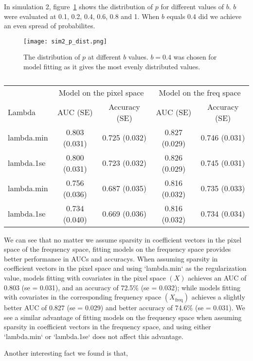 \documentclass[12pt]{article}
\begin{document}
In simulation 2, figure~\ref{fig:sim2_p_dist} shows the distribution of \( p \)
for different values of \( b \). \( b \) were evaluated at 0.1, 0.2, 0.4, 0.6,
0.8 and 1. When \( b \) equals 0.4 did we achieve an even spread of
probabilites.

\begin{figure}[H] 
	\centering
	\texttt{[image: sim2\_p\_dist.png]} 
	\caption{The distribution of \(p\) at different \( b \) values. \( b = 0.4 \) was
chosen for model fitting as it gives the most evenly distributed values.}
	\label{fig:sim2_p_dist} 
\end{figure}


\begin{table}[h!]
\centering
\caption{}
\label{tab:auc_acc_table}
\begin{tabular}{l|cc|cc}
\toprule
& \multicolumn{2}{c}{Model on the pixel space} & \multicolumn{2}{c}{Model on the freq space} \\ 
	Lambda & AUC (SE) & Accuracy (SE) & AUC (SE) & Accuracy (SE) \\ 
\midrule
	lambda.min & 0.803 (0.031) & 0.725 (0.032) & 0.827 (0.029) & 0.746 (0.031) \\
	lambda.1se & 0.800 (0.031) & 0.723 (0.032) & 0.826 (0.029) & 0.745 (0.031) \\ 
	lambda.min & 0.756 (0.036) & 0.687 (0.035) & 0.816 (0.032) & 0.735 (0.033)  \\
	lambda.1se & 0.734 (0.040) & 0.669 (0.036) & 0.816 (0.032) & 0.734 (0.034) \\
\bottomrule
\end{tabular}
\end{table}

We can see that no matter we assume sparsity in coefficient vectors in the pixel
space of the frequency space, fitting models on the frequency space provides
better performance in AUCs and accuracys. When assuming sparsity in coefficient
vectors in the pixel space and using `lambda.min` as the
regularization value, models fitting with covariates in the pixel space \( (X)
\) achieves an AUC of 0.803 (se = 0.031), and an accuracy of 72.5\% (se =
0.032); while models fitting with covariates in the corresponding frequency
space \( (X_{\text{freq}}) \) achieves a slightly better AUC of 0.827 (se =
0.029) and better accuracy of 74.6\% (se = 0.031). We see a similar advantage of
fitting models on the frequency space when assuming sparsity in coefficient
vectors in the frequency space, and using either `lambda.min` or `lambda.1se`
does not affect this advantage.

Another interesting fact we found is that, 
\end{document}
